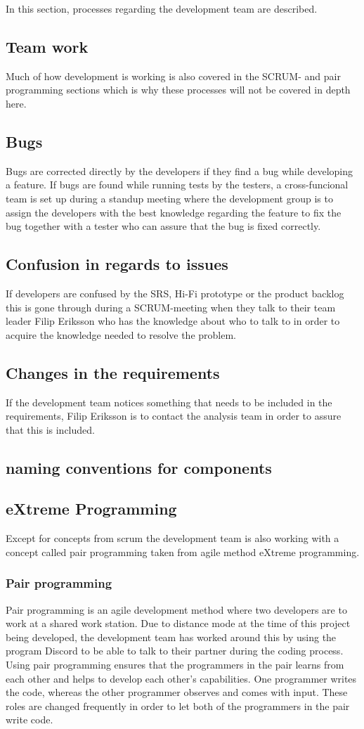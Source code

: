 In this section, processes regarding the development team are described. 
\subsection{Team work}
Much of how development is working is also covered in the SCRUM- and pair programming sections which is why these processes will not be covered in depth here. 
\subsection{Bugs}
Bugs are corrected directly by the developers if they find a bug while developing a feature. If bugs are found while running tests by the testers, a cross-funcional team is set up during a standup meeting where the development group is to assign the developers with the best knowledge regarding the feature to fix the bug together with a tester who can assure that the bug is fixed correctly. 
\subsection{Confusion in regards to issues}
If developers are confused by the SRS, Hi-Fi prototype or the product backlog this is gone through during a SCRUM-meeting when they talk to their team leader Filip Eriksson who has the knowledge about who to talk to in order to acquire the knowledge needed to resolve the problem. 
\subsection{Changes in the requirements}
If the development team notices something that needs to be included in the requirements, Filip Eriksson is to contact the analysis team in order to assure that this is included. 
\subsection{naming conventions for components} \label{Naming convention}

\subsection{eXtreme Programming}
Except for concepts from scrum the development team is also working with a concept called pair programming taken from agile method eXtreme programming. 
\subsubsection{Pair programming}
Pair programming is an agile development method where two developers are to work at a shared work station. Due to distance mode at the time of this project being developed, the development team has worked around this by using the program Discord to be able to talk to their partner during the coding process. Using pair programming ensures that the programmers in the pair learns from each other and helps to develop each other's capabilities. One programmer writes the code, whereas the other programmer observes and comes with input. These roles are changed frequently in order to let both of the programmers in the pair write code. 
